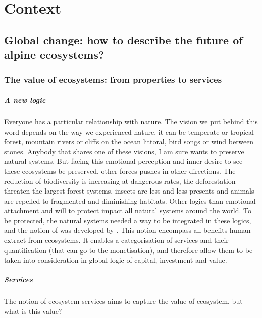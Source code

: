 

\chapter{Context}

\section{Global change: how to describe the future of alpine ecosystems?}

\subsection{The value of ecosystems: from properties to services}

\paragraph{A new logic}
Everyone has a particular relationship with nature. The vision we put behind this word depends on the way we experienced nature, it can be temperate or tropical forest, mountain rivers or cliffs on the ocean littoral, bird songs or wind between stones. Anybody that shares one of these visions, I am sure wants to preserve natural systems. But facing this emotional perception and inner desire to see these ecosystems be preserved, other forces pushes in other directions. The reduction of biodiversity is increasing at dangerous rates, the deforestation threaten the largest forest systems, insects are less and less presents and animals are repelled to fragmented and diminishing habitats. Other logics than emotional attachment and will to protect impact all natural systems around the world. To be protected, the natural systems needed a way to be integrated in these logics, and the notion of  was developed by \cite{costanza_value_1997}. This notion encompass all benefits human extract from ecosystems. It enables a categorisation of services and their quantification (that can go to the monetisation), and therefore allow them to be taken into consideration in global logic of capital, investment and value.


\paragraph{Services}
The notion of ecosystem services aims to capture the value of ecosystem, but what is this value?

